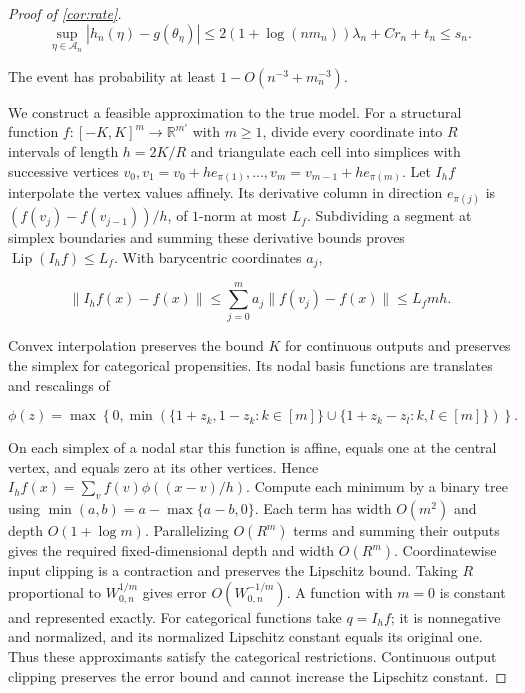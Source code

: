 \begin{proof}[Proof of \cref{cor:rate}]
\[
\sup_{\eta\in\mathcal A_n}|h_n(\eta)-g(\theta_\eta)|\leqslant2(1+\log(nm_n))\lambda_n+Cr_n+t_n\leqslant s_n.
\]

The event has probability at least $1-O(n^{-3}+m_n^{-3})$. 

We construct a feasible approximation to the true model. For a structural function $f:[-K,K]^m\rightarrow\mathbb R^{m'}$ with $m\geqslant1$, divide every coordinate into $R$ intervals of length $h=2K/R$ and triangulate each cell into simplices with successive vertices $v_0,v_1=v_0+he_{\pi(1)},\ldots,v_m=v_{m-1}+he_{\pi(m)}$. Let $I_hf$ interpolate the vertex values affinely. Its derivative column in direction $e_{\pi(j)}$ is $(f(v_j)-f(v_{j-1}))/h$, of $1$-norm at most $L_f$. Subdividing a segment at simplex boundaries and summing these derivative bounds proves $\operatorname{Lip}(I_hf)\leqslant L_f$. With barycentric coordinates $a_j$,

\[
\|I_hf(x)-f(x)\|\leqslant\sum_{j=0}^ma_j\|f(v_j)-f(x)\|\leqslant L_fmh.
\]

Convex interpolation preserves the bound $K$ for continuous outputs and preserves the simplex for categorical propensities. Its nodal basis functions are translates and rescalings of

\[
\phi(z)=\max\left\{0,\min\left(\{1+z_k,1-z_k:k\in[m]\}\cup\{1+z_k-z_l:k,l\in[m]\}\right)\right\}.
\]

On each simplex of a nodal star this function is affine, equals one at the central vertex, and equals zero at its other vertices. Hence $I_hf(x)=\sum_v f(v)\phi((x-v)/h)$. Compute each minimum by a binary tree using $\min(a,b)=a-\max\{a-b,0\}$. Each term has width $O(m^2)$ and depth $O(1+\log m)$. Parallelizing $O(R^m)$ terms and summing their outputs gives the required fixed-dimensional depth and width $O(R^m)$. Coordinatewise input clipping is a contraction and preserves the Lipschitz bound. Taking $R$ proportional to $W_{0,n}^{1/m}$ gives error $O(W_{0,n}^{-1/m})$. A function with $m=0$ is constant and represented exactly. For categorical functions take $q=I_hf$; it is nonnegative and normalized, and its normalized Lipschitz constant equals its original one. Thus these approximants satisfy the categorical restrictions. Continuous output clipping preserves the error bound and cannot increase the Lipschitz constant. 


\end{proof}
